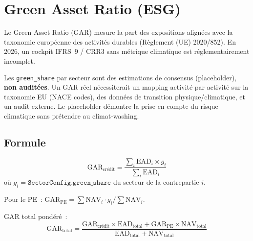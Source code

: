 \documentclass[12pt,a4paper]{article}
\begin{document}
\section{Green Asset Ratio (ESG)}
\label{sec:gar}

\begin{definitionbox}
Le Green Asset Ratio (GAR) mesure la part des expositions align\'ees avec la taxonomie europ\'eenne des activit\'es durables (R\`eglement (UE) 2020/852). En 2026, un cockpit IFRS~9 / CRR3 sans m\'etrique climatique est r\'eglementairement incomplet.
\end{definitionbox}

\begin{warningbox}
Les \texttt{green\_share} par secteur sont des estimations de consensus (placeholder), \textbf{non audit\'ees}. Un GAR r\'eel n\'ecessiterait un mapping activit\'e par activit\'e sur la taxonomie EU (NACE codes), des donn\'ees de transition physique/climatique, et un audit externe. Le placeholder d\'emontre la prise en compte du risque climatique sans pr\'etendre au climat-washing.
\end{warningbox}

\subsection{Formule}

\begin{formulebox}
\begin{equation}
    \text{GAR}_{\text{cr\'edit}} = \frac{\sum_{i} \text{EAD}_i \times g_i}{\sum_{i} \text{EAD}_i}
    \label{eq:gar_credit}
\end{equation}
o\`u $g_i = \texttt{SectorConfig.green\_share}$ du secteur de la contrepartie $i$.

Pour le PE~: $\text{GAR}_{\text{PE}} = \sum \text{NAV}_i \cdot g_i / \sum \text{NAV}_i$.

GAR total pond\'er\'e~:
\begin{equation}
    \text{GAR}_{\text{total}} = \frac{\text{GAR}_{\text{cr\'edit}} \times \text{EAD}_{\text{total}} + \text{GAR}_{\text{PE}} \times \text{NAV}_{\text{total}}}{\text{EAD}_{\text{total}} + \text{NAV}_{\text{total}}}
    \label{eq:gar_total}
\end{equation}
\end{formulebox}
\end{document}

